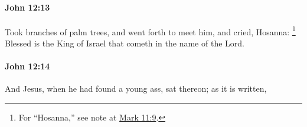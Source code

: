 		\paragraph{John 12:13} %
			\label{JOHN-12-13}

			Took branches of palm trees, and went forth to meet him, and cried, Hosanna:%
				\footnote{%
					For ``Hosanna,'' see note at \hyperref[MARK-11-9]{Mark 11:9}.
					}
			Blessed is the King of Israel that cometh in the name of the Lord.

			\begin{framed}
				\scriptsize
				\begin{compactdesc}
					\item[SBLG] 
				\end{compactdesc}
			\end{framed}

		\paragraph{John 12:14} %
			\label{JOHN-12-14}

			And Jesus, when he had found a young ass, sat thereon; as it is written,

